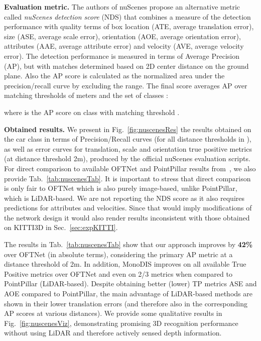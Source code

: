 \documentclass[10pt,twocolumn,letterpaper]{article}
\newcommand{\monodis}{MonoDIS}
\renewcommand{\paragraph}[1]{

        \vspace{3pt}
	\noindent\textbf{#1}}
\begin{document}
\paragraph{Evaluation metric.}
The authors of nuScenes propose an alternative metric called \emph{nuScenes detection score} (NDS) that combines a measure of the detection performance with quality terms of box location (ATE, average translation error), size (ASE, average scale error), orientation (AOE, average orientation error), attributes (AAE, average attribute error) and velocity (AVE, average velocity error). The detection performance is measured in terms of Average Precision (AP), but with matches determined based on 2D center distance on the ground plane. Also the AP score is calculated as the normalized area under the precision/recall curve by excluding the  range. The final score averages AP over matching thresholds of  meters and the set of classes :

where  is the AP score on class  with matching threshold . 

\paragraph{Obtained results.}
We present in Fig.~\ref{fig:nuscenesRes} the results obtained on the car class in terms of Precision/Recall curves (for all distance thresholds in ), as well as error curves for translation, scale and orientation true positive metrics (at distance threshold 2m), produced by the official nuScenes evaluation scripts. For direct comparison to available OFTNet and PointPillar results from~\cite{Cae+19}, we also provide Tab.~\ref{tab:nuscenesTab}. It is important to stress that direct comparison is only fair to OFTNet which is also purely image-based, unlike PointPillar, which is LiDAR-based. We are not reporting the NDS score as it also requires predictions for attributes and velocities. Since that would imply modifications of the network design it would also render results inconsistent with those obtained on KITTI3D in Sec.~\ref{sec:expKITTI}. 

The results in Tab.~\ref{tab:nuscenesTab} show that our approach improves by \textbf{42\%} over OFTNet (in absolute terms), considering the primary AP metric at a distance threshold of 2m. In addition, \monodis{} improves on all available True Positive metrics over OFTNet and even on 2/3 metrics when compared to PointPillar (LiDAR-based). Despite obtaining better (lower) TP metrics ASE and AOE compared to PointPillar, the main advantage of LiDAR-based methods are shown in their lower translation errors (and therefore also in the corresponding AP scores at various distances). We provide some qualitative results in Fig.~\ref{fig:nuscenesViz}, demonstrating promising 3D recognition performance without using LiDAR and therefore actively sensed depth information.
\end{document}
